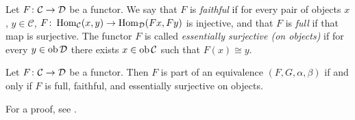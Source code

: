 \documentclass[a4paper,openany]{scrbook}
\renewcommand{\C}{\mathcal C}
\begin{document}
\begin{defn}
Let $F\colon \C \to \D$ be a functor.
We say that $F$ is \emph{faithful} if for every pair of objects $x$, $y \in \C$, $F\colon \Hom_\C(x,y) \to \Hom_\D(Fx,Fy)$ is injective, and that $F$ is \emph{full} if that map is surjective. The functor $F$ is called \emph{essentially surjective (on objects)} if for every $y \in \operatorname{ob} \mathcal D$ there exists $x \in \ob \C$ such that $F(x) \cong y$. 
\end{defn}
\begin{prop}
Let $F\colon \C \to \D$ be a functor. Then $F$ is part of an equivalence $(F,G, \alpha, \beta)$ if and only if $F$ is full, faithful, and essentially surjective on objects.
\end{prop}
For a proof, see \cite[Theorem IV.4.1]{maclane:cwm}.
\end{document}
